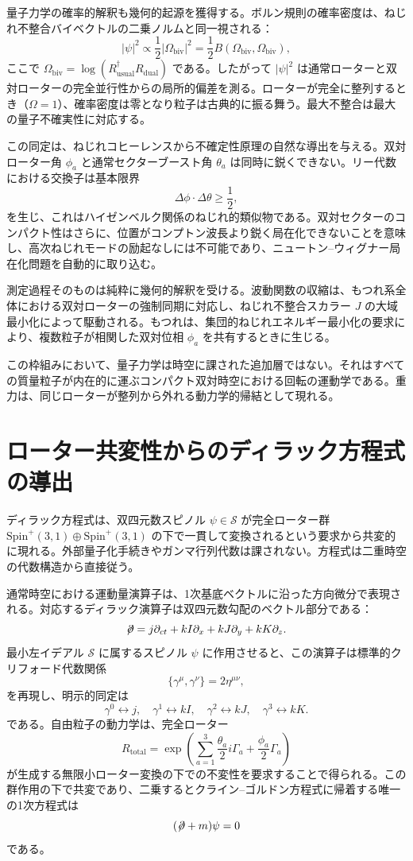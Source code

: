 \documentclass[a4paper]{article}
\begin{document}
量子力学の確率的解釈も幾何的起源を獲得する。ボルン規則の確率密度は、ねじれ不整合バイベクトルの二乗ノルムと同一視される：
\[
|\psi|^2 \propto \frac{1}{2} |\Omega_\text{biv}|^2 = \frac{1}{2} B(\Omega_\text{biv}, \Omega_\text{biv}),
\]
ここで $\Omega_\text{biv} = \log(R_\text{usual}^\dagger R_\text{dual})$ である。したがって $|\psi|^2$ は通常ローターと双対ローターの完全並行性からの局所的偏差を測る。ローターが完全に整列するとき（$\Omega = 1$）、確率密度は零となり粒子は古典的に振る舞う。最大不整合は最大の量子不確実性に対応する。

この同定は、ねじれコヒーレンスから不確定性原理の自然な導出を与える。双対ローター角 $\phi_a$ と通常セクターブースト角 $\theta_a$ は同時に鋭くできない。リー代数における交換子は基本限界
\[
\Delta\phi \cdot \Delta\theta \geq \frac{1}{2},
\]
を生じ、これはハイゼンベルク関係のねじれ的類似物である。双対セクターのコンパクト性はさらに、位置がコンプトン波長より鋭く局在化できないことを意味し、高次ねじれモードの励起なしには不可能であり、ニュートン--ウィグナー局在化問題を自動的に取り込む。

測定過程そのものは純粋に幾何的解釈を受ける。波動関数の収縮は、もつれ系全体における双対ローターの強制同期に対応し、ねじれ不整合スカラー $J$ の大域最小化によって駆動される。もつれは、集団的ねじれエネルギー最小化の要求により、複数粒子が相関した双対位相 $\phi_a$ を共有するときに生じる。

この枠組みにおいて、量子力学は時空に課された追加層ではない。それはすべての質量粒子が内在的に運ぶコンパクト双対時空における回転の運動学である。重力は、同じローターが整列から外れる動力学的帰結として現れる。

\section{ローター共変性からのディラック方程式の導出}
\label{sec:dirac}

ディラック方程式は、双四元数スピノル $\psi \in \mathcal{S}$ が完全ローター群 $\mathrm{Spin}^+(3,1) \oplus \mathrm{Spin}^+(3,1)$ の下で一貫して変換されるという要求から共変的に現れる。外部量子化手続きやガンマ行列代数は課されない。方程式は二重時空の代数構造から直接従う。

通常時空における運動量演算子は、1次基底ベクトルに沿った方向微分で表現される。対応するディラック演算子は双四元数勾配のベクトル部分である：
\[
\not\!\partial = j \partial_{ct} + kI \partial_x + kJ \partial_y + kK \partial_z.
\]
最小左イデアル $\mathcal{S}$ に属するスピノル $\psi$ に作用させると、この演算子は標準的クリフォード代数関係
\[
\{\gamma^\mu, \gamma^\nu\} = 2\eta^{\mu\nu},
\]
を再現し、明示的同定は
\[
\gamma^0 \leftrightarrow j, \quad \gamma^1 \leftrightarrow kI, \quad \gamma^2 \leftrightarrow kJ, \quad \gamma^3 \leftrightarrow kK.
\]
である。自由粒子の動力学は、完全ローター
\[
R_\text{total} = \exp\left( \sum_{a=1}^3 \frac{\theta_a}{2} i\Gamma_a + \frac{\phi_a}{2} \Gamma_a \right)
\]
が生成する無限小ローター変換の下での不変性を要求することで得られる。この群作用の下で共変であり、二乗するとクライン--ゴルドン方程式に帰着する唯一の1次方程式は
\[
(\not\!\partial + m)\psi = 0
\]
である。
\end{document}
